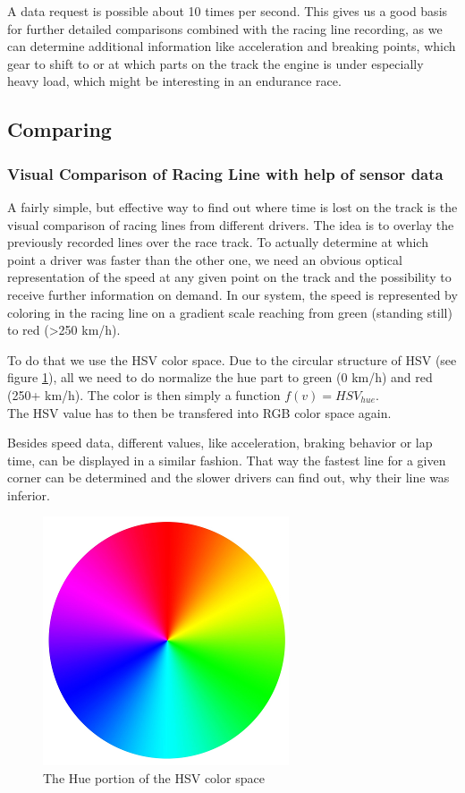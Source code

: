 A data request is possible about 10 times per second. This gives us a good basis for further detailed comparisons combined with the racing line recording, as we can determine additional information like acceleration and breaking points, which gear to shift to or at which parts on the track the engine is under especially heavy load, which might be interesting in an endurance race.

\subsection{Comparing}
\subsubsection{Visual Comparison of Racing Line with help of sensor data}
A fairly simple, but effective way to find out where time is lost on the track is the visual comparison of racing lines from different drivers. The idea is to overlay the previously recorded lines over the race track. To actually determine at which point a driver was faster than the other one, we need an obvious optical representation of the speed at any given point on the track and the possibility to receive further information on demand.
In our system, the speed is represented by coloring in the racing line on a gradient scale reaching from green (standing still) to red (>250 km/h).

To do that we use the HSV color space. Due to the circular structure of HSV (see figure \ref{fig:hsv_gradient}), all we need to do normalize the hue part to green (0 km/h) and red (250+ km/h). The color is then simply a function $f(v) = HSV_{hue}$.\\
The HSV value has to then be transfered into RGB color space again.

Besides speed data, different values, like acceleration, braking behavior or lap time, can be displayed in a similar fashion. That way the fastest line for a given corner can be determined and the slower drivers can find out, why their line was inferior.

\begin{figure}[!ht]
\centering
\includegraphics[width=.3\textwidth]{gradient_hsv}
\caption{The Hue portion of the HSV color space}
\label{fig:hsv_gradient}
\end{figure}

